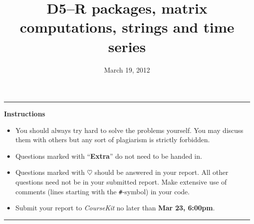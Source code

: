 \documentclass[a4paper]{article}
\title{D5--R packages, matrix computations, strings and time series}
\date{March 19, 2012}
\begin{document}
\maketitle
\hrule
\begin{center}
\textbf{Instructions}
\end{center}
\begin{itemize}
\item You should always try hard to solve the problems yourself. You may
  discuss them with others but any sort of plagiarism is strictly forbidden.

\item Questions marked with ``\textbf{Extra}'' do not need to be handed in. 

\item Questions marked with $\heartsuit$ should be answered in your report. All
  other questions need not be in your submitted report. Make extensive use of
  comments (lines starting with the \texttt{\#}-symbol) in your code.

\item Submit your report to \emph{CourseKit} no later than \textbf{Mar 23,
    6:00pm}.
\end{itemize}
\hrule
  
\end{document}
